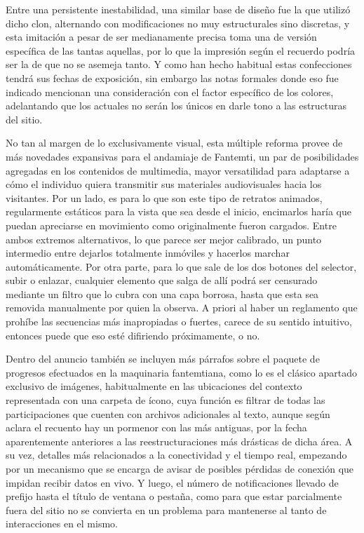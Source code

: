 \documentclass[
]{book}
\begin{document}
Entre una persistente inestabilidad, una similar base de diseño fue la que utilizó dicho clon, alternando con modificaciones no muy estructurales sino discretas, y esta imitación a pesar de ser medianamente precisa toma una de versión específica de las tantas aquellas, por lo que la impresión según el recuerdo podría ser la de que no se asemeja tanto. Y como han hecho habitual estas confecciones tendrá sus fechas de exposición, sin embargo las notas formales donde eso fue indicado mencionan una consideración con el factor específico de los colores, adelantando que los actuales no serán los únicos en darle tono a las estructuras del sitio.

No tan al margen de lo exclusivamente visual, esta múltiple reforma provee de más novedades expansivas para el andamiaje de Fantemti, un par de posibilidades agregadas en los contenidos de multimedia, mayor versatilidad para adaptarse a cómo el individuo quiera transmitir sus materiales audiovisuales hacia los visitantes. Por un lado, es para lo que son este tipo de retratos animados, regularmente estáticos para la vista que sea desde el inicio, encimarlos haría que puedan apreciarse en movimiento como originalmente fueron cargados. Entre ambos extremos alternativos, lo que parece ser mejor calibrado, un punto intermedio entre dejarlos totalmente inmóviles y hacerlos marchar automáticamente. Por otra parte, para lo que sale de los dos botones del selector, subir o enlazar, cualquier elemento que salga de allí podrá ser censurado mediante un filtro que lo cubra con una capa borrosa, hasta que esta sea removida manualmente por quien la observa. A priori al haber un reglamento que prohíbe las secuencias más inapropiadas o fuertes, carece de su sentido intuitivo, entonces puede que eso esté difiriendo próximamente, o no.

Dentro del anuncio también se incluyen más párrafos sobre el paquete de progresos efectuados en la maquinaria fantemtiana, como lo es el clásico apartado exclusivo de imágenes, habitualmente en las ubicaciones del contexto representada con una carpeta de ícono, cuya función es filtrar de todas las participaciones que cuenten con archivos adicionales al texto, aunque según aclara el recuento hay un pormenor con las más antiguas, por la fecha aparentemente anteriores a las reestructuraciones más drásticas de dicha área. A su vez, detalles más relacionados a la conectividad y el tiempo real, empezando por un mecanismo que se encarga de avisar de posibles pérdidas de conexión que impidan recibir datos en vivo. Y luego, el número de notificaciones llevado de prefijo hasta el título de ventana o pestaña, como para que estar parcialmente fuera del sitio no se convierta en un problema para mantenerse al tanto de interacciones en el mismo.
\end{document}
